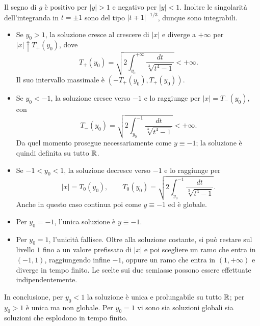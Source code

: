 \documentclass[a4paper]{article}
\begin{document}
\begin{radioactive}
\begin{snippetsolution}{}
    Il segno di \(g\) è positivo per \(|y|>1\) e negativo per \(|y|<1\).
    Inoltre le singolarità dell'integranda in \(t=\pm1\) sono del tipo
    \(|t\mp1|^{-1/3}\), dunque sono integrabili.

    \begin{itemize}
        \item Se \(y_0>1\), la soluzione cresce al crescere di \(|x|\) e diverge a
        \(+\infty\) per \(|x|\uparrow T_+(y_0)\), dove
        \[
            T_+(y_0)=\sqrt{2\int_{y_0}^{+\infty}
            \frac{dt}{\sqrt[3]{t^4-1}}}<+\infty.
        \]
        Il suo intervallo massimale è \((-T_+(y_0),T_+(y_0))\).

        \item Se \(y_0<-1\), la soluzione cresce verso \(-1\) e lo raggiunge per
        \(|x|=T_-(y_0)\), con
        \[
            T_-(y_0)=\sqrt{2\int_{y_0}^{-1}
            \frac{dt}{\sqrt[3]{t^4-1}}}<+\infty.
        \]
        Da quel momento prosegue necessariamente come \(y\equiv-1\); la soluzione è
        quindi definita su tutto \(\mathbb{R}\).

        \item Se \(-1<y_0<1\), la soluzione decresce verso \(-1\) e lo raggiunge per
        \[
            |x|=T_0(y_0),\qquad
            T_0(y_0)=\sqrt{2\int_{y_0}^{-1}
            \frac{dt}{\sqrt[3]{t^4-1}}}.
        \]
        Anche in questo caso continua poi come \(y\equiv-1\) ed è globale.

        \item Per \(y_0=-1\), l'unica soluzione è \(y\equiv-1\).

        \item Per \(y_0=1\), l'unicità fallisce. Oltre alla soluzione costante, si può
        restare sul livello \(1\) fino a un valore prefissato di \(|x|\) e poi scegliere
        un ramo che entra in \((-1,1)\), raggiungendo infine \(-1\), oppure un ramo che
        entra in \((1,+\infty)\) e diverge in tempo finito. Le scelte sui due semiasse
        possono essere effettuate indipendentemente.
    \end{itemize}

    In conclusione, per \(y_0<1\) la soluzione è unica e prolungabile su tutto
    \(\mathbb{R}\); per \(y_0>1\) è unica ma non globale. Per \(y_0=1\) vi sono sia
    soluzioni globali sia soluzioni che esplodono in tempo finito.
    \wrapfill
\end{snippetsolution}
\end{radioactive}
\end{document}
